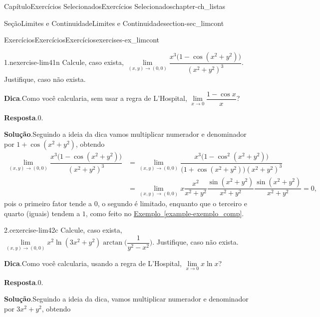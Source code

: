 \documentclass[oneside,10pt,]{book}
\newcommand{\blocktitlefont}{\relax}
\newcommand{\xreffont}{\relax}
\numberwithin{equation}{section}
\begin{document}
\begin{chapterptx}{Capítulo}{Exercícios Selecionados}{}{Exercícios Selecionados}{}{}{chapter-ch_listas}
\begin{sectionptx}{Seção}{Limites e Continuidade}{}{Limites e Continuidade}{}{}{section-sec_limcont}
%
%
\typeout{************************************************}
\typeout{************************************************}
%
\begin{exercises-subsection-numberless}{Exercícios}{Exercícios}{}{Exercícios}{}{}{exercises-ex_limcont}
\begin{divisionexercise}{1.n}{}{}{exercise-lim41n}%
Calcule, caso exista, \(\lim\limits_{(x,y)\to(0,0)}
\dfrac{x^3\big(1-\cos(x^2+y^2)\big)}{(x^2+y^2)^3}\). Justifique, caso não exista.%
\par\smallskip%
\noindent\textbf{\blocktitlefont Dica}.\hypertarget{hint-lim41n-b}{}\quad{}Como você calcularia, sem usar a regra de L'Hospital, \(\lim\limits_{x\to 0}\dfrac{1-\cos x}{x}\)?%
\par\smallskip%
\noindent\textbf{\blocktitlefont Resposta}.\hypertarget{answer-lim41n-c}{}\quad{}\(0\).%
\par\smallskip%
\noindent\textbf{\blocktitlefont Solução}.\hypertarget{solution-lim41n-d}{}\quad{}Seguindo a ideia da dica vamos multiplicar numerador e denominador por \(1+\cos(x^2+y^2)\), obtendo%
\begin{align*}
\lim\limits_{(x,y)\to(0,0)}
\dfrac{x^3\big(1-\cos(x^2+y^2)\big)}{(x^2+y^2)^3}
&=\lim\limits_{(x,y)\to(0,0)}
\dfrac{x^3\big(1-\cos^2(x^2+y^2)\big)}
{\big(1+\cos(x^2+y^2)\big)(x^2+y^2)^3}\\
&=\lim\limits_{(x,y)\to(0,0)}
x\dfrac{x^2}{x^2+y^2}\dfrac{\sin(x^2+y^2)}{x^2+y^2}
\dfrac{\sin(x^2+y^2)}{x^2+y^2}=0,
\end{align*}
pois o primeiro fator tende a \(0\), o segundo é limitado, enquanto que o terceiro e quarto (iguais) tendem a \(1\), como feito no \hyperref[example-exemplo_comp]{Exemplo~{\xreffont\ref{example-exemplo_comp}}}.%
\end{divisionexercise}%
\begin{divisionexercise}{2.c}{}{}{exercise-lim42c}%
Calcule, caso exista, \(\lim\limits_{(x,y)\to(0,0)}
x^2\ln(3x^2+y^2)\arctan\big(\dfrac{1}{y^2-x^2}\big)\). Justifique, caso não exista.%
\par\smallskip%
\noindent\textbf{\blocktitlefont Dica}.\hypertarget{hint-lim42c-b}{}\quad{}Como você calcularia, usando a regra de L'Hospital, \(\lim\limits_{x\to 0}x\ln x\)?%
\par\smallskip%
\noindent\textbf{\blocktitlefont Resposta}.\hypertarget{answer-lim42c-c}{}\quad{}\(0\).%
\par\smallskip%
\noindent\textbf{\blocktitlefont Solução}.\hypertarget{solution-lim42c-d}{}\quad{}Seguindo a ideia da dica, vamos multiplicar numerador e denominador por \(3x^2+y^2\), obtendo%

\end{divisionexercise}
\end{exercises-subsection-numberless}
\end{sectionptx}
\end{chapterptx}
\end{document}
